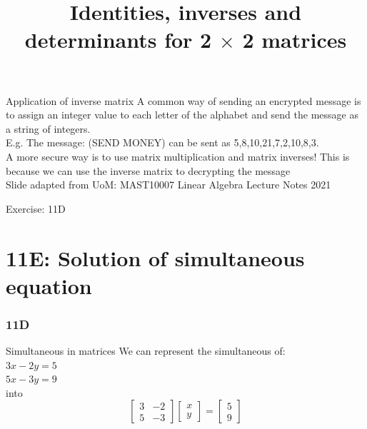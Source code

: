 \documentclass[
	11pt, %
]{beamer}
\begin{document}
\begin{frame}{Application of inverse matrix}
    A common way of sending an encrypted message is to assign an integer value to each letter of the alphabet and send the message as a string of integers.\\
    E.g. The message: (SEND MONEY) can be sent as 5,8,10,21,7,2,10,8,3.\\
    A more secure way is to use matrix multiplication and matrix inverses! This is because we can use the inverse matrix to decrypting the message\\
    Slide adapted from UoM: MAST10007 Linear Algebra Lecture Notes 2021
\end{frame}

\begin{frame}{Exercise: 11D}
\end{frame}
\section{11E: Solution of simultaneous equation}
\begin{frame}
    \frametitle{11D}
    \begin{center}
        \title{Identities, inverses and determinants for 2 $\times$ 2 matrices}
        \maketitle
    \end{center}
\end{frame}

\begin{frame}{Simultaneous in matrices}
    We can represent the simultaneous of:\\
    $3x-2y=5$\\
    $5x-3y=9$\\
    into
    \[
        \begin{bmatrix}
            3 & -2\\
            5 & -3
        \end{bmatrix}
        \begin{bmatrix}
            x\\
            y
        \end{bmatrix}
        =
        \begin{bmatrix}
            5\\
            9
        \end{bmatrix}
    \]
\end{frame}
\end{document}

